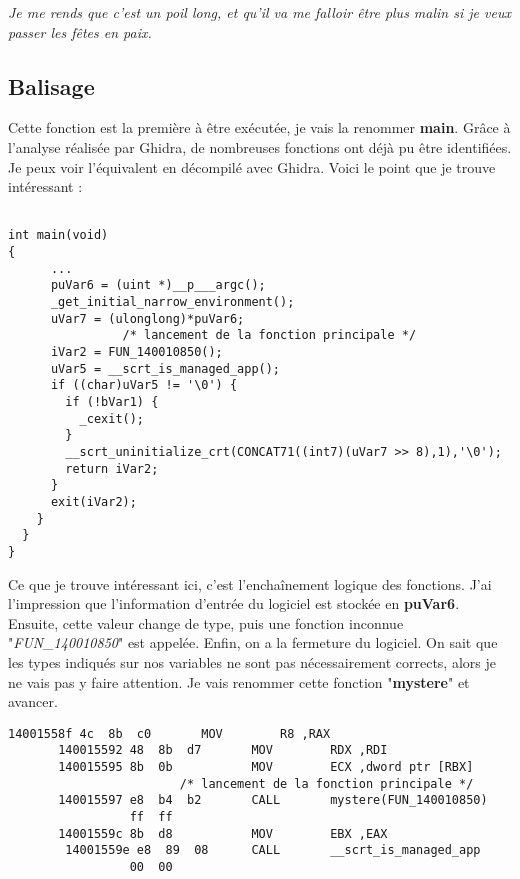 \documentclass{rapport}
\begin{document}
\small{\textit{Je me rends que c'est un poil long, et qu'il va me falloir être plus malin si je veux passer les fêtes en paix.}}

\newpage
\subsection{Balisage}

\hspace{18pt}Cette fonction est la première à être exécutée, je vais la renommer \textbf{main}. Grâce à l'analyse réalisée par Ghidra, de nombreuses fonctions ont déjà pu être identifiées. Je peux voir l'équivalent en décompilé avec Ghidra. Voici le point que je trouve intéressant :

\begin{lstlisting}[caption={main}, label={lst:main}]

int main(void)
{
      ...
      puVar6 = (uint *)__p___argc();
      _get_initial_narrow_environment();
      uVar7 = (ulonglong)*puVar6;
                /* lancement de la fonction principale */
      iVar2 = FUN_140010850();
      uVar5 = __scrt_is_managed_app();
      if ((char)uVar5 != '\0') {
        if (!bVar1) {
          _cexit();
        }
        __scrt_uninitialize_crt(CONCAT71((int7)(uVar7 >> 8),1),'\0');
        return iVar2;
      }
      exit(iVar2);
    }
  }
}
\end{lstlisting}

\hspace{18pt}Ce que je trouve intéressant ici, c'est l'enchaînement logique des fonctions. J'ai l'impression que l'information d'entrée du logiciel est stockée en \textbf{puVar6}. Ensuite, cette valeur change de type, puis une fonction inconnue "\textit{FUN\_140010850}" est appelée. Enfin, on a la fermeture du logiciel. On sait que les types indiqués sur nos variables ne sont pas nécessairement corrects, alors je ne vais pas y faire attention. Je vais renommer cette fonction "\textbf{mystere}" et avancer.
\medbreak

\begin{lstlisting}[caption={main - assembleur}, label={lst:main_assembleur}]
       14001558f 4c  8b  c0       MOV        R8 ,RAX
       140015592 48  8b  d7       MOV        RDX ,RDI
       140015595 8b  0b           MOV        ECX ,dword ptr [RBX]
                        /* lancement de la fonction principale */
       140015597 e8  b4  b2       CALL       mystere(FUN_140010850)
                 ff  ff
       14001559c 8b  d8           MOV        EBX ,EAX
        14001559e e8  89  08      CALL       __scrt_is_managed_app
                 00  00
\end{lstlisting}
\end{document}
